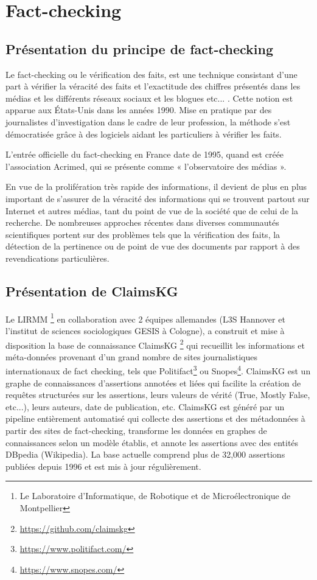 \documentclass[oneside,13pt,a4paper]{report}
\begin{document}
\section{Fact-checking}

\subsection{Présentation du principe de fact-checking}

Le fact-checking ou le vérification des faits, est une technique consistant d'une part à vérifier la véracité des faits et l'exactitude des chiffres présentés dans les médias et les différents réseaux sociaux et les blogues etc... .
Cette notion est apparue aux États-Unis dans les années 1990. Mise en pratique par des journalistes d'investigation dans le cadre de leur profession, la méthode s'est démocratisée grâce à des logiciels aidant les particuliers à vérifier les faits.

L'entrée officielle du fact-checking en France date de 1995, quand est créée l'association Acrimed, qui se présente comme « l'observatoire des médias ».

En vue de la prolifération très rapide des informations, il devient de plus en plus important de s'assurer de la véracité des informations qui se trouvent partout sur Internet et autres médias, tant du point de vue de la société que de celui de la recherche. De nombreuses approches récentes dans diverses communautés scientifiques portent sur des problèmes tels que la vérification des faits, la détection de la pertinence ou de point de vue des documents par rapport à des revendications particulières.

\subsection{Présentation de ClaimsKG}


Le LIRMM \footnote{Le Laboratoire d’Informatique, de Robotique et de Microélectronique de Montpellier} en collaboration avec 2 équipes allemandes (L3S Hannover et l’institut de sciences sociologiques GESIS à Cologne), a construit et mise à disposition la base de connaissance ClaimsKG \footnote{\url{https://github.com/claimskg}} qui recueillit les informations et méta-données provenant d’un grand nombre de sites journalistiques internationaux de fact checking, tels que Politifact\footnote{\url{https://www.politifact.com/}} ou Snopes\footnote{\url{https://www.snopes.com/}}. ClaimsKG est un graphe de connaissances d’assertions annotées et liées qui facilite la création de requêtes structurées sur les assertions, leurs valeurs de vérité (True, Mostly False, etc...), leurs auteurs, date de publication, etc. ClaimsKG est généré par un pipeline entièrement automatisé qui collecte des assertions et des métadonnées à partir des sites de fact-checking, transforme les données en graphes de connaissances selon un modèle établis, et annote les assertions avec des entités DBpedia (Wikipedia). La base actuelle comprend plus de 32,000 assertions publiées depuis 1996 et est mis à jour régulièrement.
\end{document}
